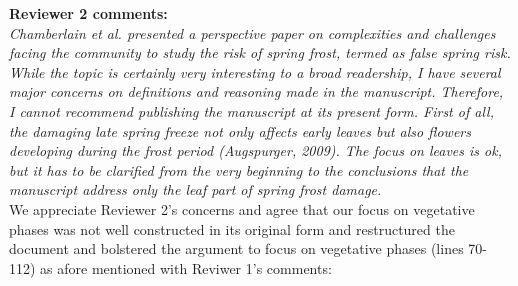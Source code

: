 \documentclass[11pt,a4paper]{article}
\begin{document}

\textbf {Reviewer 2 comments:} \\

\textit{Chamberlain et al. presented a perspective paper on complexities and challenges facing the community to study the risk of spring frost, termed as false spring risk. While the topic is certainly very interesting to a broad readership, I have several major concerns on definitions and reasoning made in the manuscript. Therefore, I cannot recommend publishing the manuscript at its present form. First of all, the damaging late spring freeze not only affects early leaves but also flowers developing during the frost period (Augspurger, 2009). The focus on leaves is ok, but it has to be clarified from the very beginning to the conclusions that the manuscript address only the leaf part of spring frost damage.}\\

We appreciate Reviewer 2's concerns and agree that our focus on vegetative phases was not well constructed in its original form and restructured the document and bolstered the argument to focus on vegetative phases (lines 70-112) as afore mentioned with Reviwer 1's comments: \\
\end{document}

